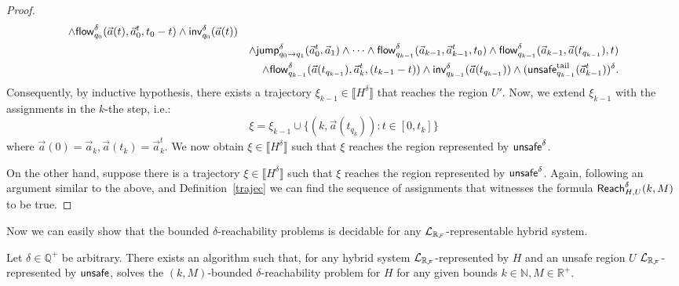 \documentclass[12pt]{article}
\begin{document}
\begin{proof}
\begin{eqnarray*}
\wedge \mathsf{flow}^{\delta}_{q_0}(\vec a(t), \vec a_0^t, t_0-t)\wedge \mathsf{inv}^{\delta}_{q_0}(\vec a(t))\\
& & \wedge \mathsf{jump}^{\delta}_{q_0\rightarrow q_1}(\vec a_0^t, \vec a_1)\wedge\cdots\wedge \mathsf{flow}_{q_{k-1}}^{\delta}(\vec a_{k-1}, \vec a_{k-1}^t, t_0)
\wedge\mathsf{flow}_{q_{k-1}}^{\delta}(\vec a_{k-1}, \vec a(t_{q_{k-1}}), t)\\
& &\wedge \mathsf{flow}^{\delta}_{q_{k-1}}(\vec a(t_{q_{k-1}}), \vec a_k^t, (t_{k-1}-t))\wedge \mathsf{inv}^{\delta}_{q_{k-1}}(\vec a(t_{q_{k-1}}))\wedge(\mathsf{unsafe}_{q_{k-1}}^{\mathrm{tail}}(\vec a_{k-1}^t))^{\delta}.
\end{eqnarray*}
Consequently, by inductive hypothesis, there exists a trajectory $\xi_{k-1}\in\llbracket H^{\delta}\rrbracket$ that reaches the region $U'$. Now, we extend $\xi_{k-1}$ with the assignments in the $k$-the step, i.e.:
$$\xi = \xi_{k-1}\cup\{(k,\vec a(t_{q_k})): t\in [0,t_k]\}$$
where $\vec a(0) = \vec a_k, \vec a(t_k)=\vec a_k^t$. We now obtain $\xi\in \llbracket H^{\delta}\rrbracket$ such that $\xi$ reaches the region represented by $\mathsf{unsafe}^{\delta}$.

On the other hand, suppose there is a trajectory $\xi\in\llbracket H^{\delta}\rrbracket$ such that $\xi$ reaches the region represented by $\mathsf{unsafe}^{\delta}$. Again, following an argument similar to the above, and Definition~\ref{trajec} we can find the sequence of assignments that witnesses the formula $\mathsf{Reach}^{\delta}_{H,U}(k,M)$ to be true.
\end{proof}
Now we can easily show that the bounded $\delta$-reachability problems is decidable for any $\mathcal{L}_{\mathbb{R}_{\mathcal{F}}}$-representable hybrid system.
\begin{theorem}[Decidability]
Let $\delta\in \mathbb{Q}^+$ be arbitrary. There exists an algorithm such that, for any hybrid system $\mathcal{L}_{\mathbb{R}_{\mathcal{F}}}$-represented by $H$ and an unsafe region $U$ $\mathcal{L}_{\mathbb{R}_{\mathcal{F}}}$-represented by $\mathsf{unsafe}$, solves the $(k,M)$-bounded $\delta$-reachability problem for $H$ for any given bounds $k\in \mathbb{N}, M\in \mathbb{R}^+$.
\end{theorem}
\end{document}
